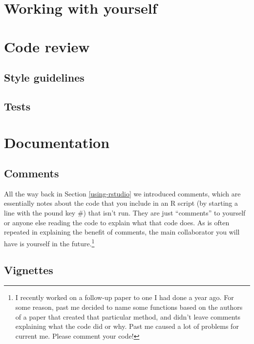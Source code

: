 \documentclass[
  12pt,
]{book}
\begin{document}
\hypertarget{working-with-yourself}{%
\section{Working with yourself}\label{working-with-yourself}}

\hypertarget{code-review}{%
\section{Code review}\label{code-review}}

\hypertarget{style-guidelines}{%
\subsection{Style guidelines}\label{style-guidelines}}

\hypertarget{tests}{%
\subsection{Tests}\label{tests}}

\hypertarget{documentation}{%
\section{Documentation}\label{documentation}}

\hypertarget{comments}{%
\subsection{Comments}\label{comments}}

All the way back in Section \ref{using-rstudio} we introduced comments, which are essentially notes about the code that you include in an R script (by starting a line with the pound key \#) that isn't run. They are just ``comments'' to yourself or anyone else reading the code to explain what that code does. As is often repeated in explaining the benefit of comments, the main collaborator you will have is yourself in the future.\footnote{I recently worked on a follow-up paper to one I had done a year ago. For some reason, past me decided to name some functions based on the authors of a paper that created that particular method, and didn't leave comments explaining what the code did or why. Past me caused a lot of problems for current me. Please comment your code!}

\hypertarget{vignettes}{%
\subsection{Vignettes}\label{vignettes}}
\end{document}
